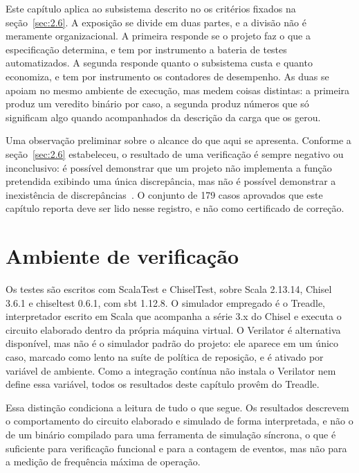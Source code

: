 Este capítulo aplica ao subsistema descrito no  os critérios fixados na seção~\ref{sec:2.6}. A exposição se divide em duas partes, e a divisão não é meramente organizacional. A primeira responde se o projeto faz o que a especificação determina, e tem por instrumento a bateria de testes automatizados. A segunda responde quanto o subsistema custa e quanto economiza, e tem por instrumento os contadores de desempenho. As duas se apoiam no mesmo ambiente de execução, mas medem coisas distintas: a primeira produz um veredito binário por caso, a segunda produz números que só significam algo quando acompanhados da descrição da carga que os gerou.

Uma observação preliminar sobre o alcance do que aqui se apresenta. Conforme a seção~\ref{sec:2.6} estabeleceu, o resultado de uma verificação é sempre negativo ou inconclusivo: é possível demonstrar que um projeto não implementa a função pretendida exibindo uma única discrepância, mas não é possível demonstrar a inexistência de discrepâncias~\cite{bergeron2006testbenches}. O conjunto de 179 casos aprovados que este capítulo reporta deve ser lido nesse registro, e não como certificado de correção.

\section{Ambiente de verificação}\label{sec:6.1}

Os testes são escritos com ScalaTest e ChiselTest, sobre Scala 2.13.14, Chisel 3.6.1 e chiseltest 0.6.1, com sbt 1.12.8. O simulador empregado é o Treadle, interpretador escrito em Scala que acompanha a série 3.x do Chisel e executa o circuito elaborado dentro da própria máquina virtual. O Verilator é alternativa disponível, mas não é o simulador padrão do projeto: ele aparece em um único caso, marcado como lento na suíte de política de reposição, e é ativado por variável de ambiente. Como a integração contínua não instala o Verilator nem define essa variável, todos os resultados deste capítulo provêm do Treadle.

Essa distinção condiciona a leitura de tudo o que segue. Os resultados descrevem o comportamento do circuito elaborado e simulado de forma interpretada, e não o de um binário compilado para uma ferramenta de simulação síncrona, o que é suficiente para verificação funcional e para a contagem de eventos, mas não para a medição de frequência máxima de operação.

